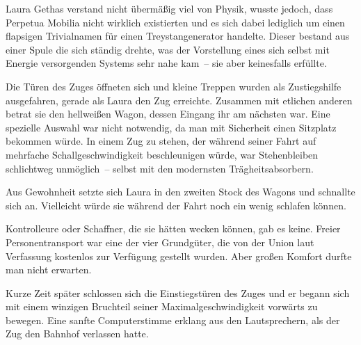 \par

Laura Gethas verstand nicht übermäßig viel von Physik, wusste jedoch, dass Perpetua Mobilia nicht wirklich existierten und es sich dabei lediglich um einen flapsigen Trivialnamen für einen Treystangenerator handelte. Dieser bestand aus einer Spule die sich ständig drehte, was der Vorstellung eines sich selbst mit Energie versorgenden Systems sehr nahe kam~-- sie aber keinesfalls erfüllte.

\par

Die Türen des Zuges öffneten sich und kleine Treppen wurden als Zustiegshilfe ausgefahren, gerade als Laura den Zug erreichte. Zusammen mit etlichen anderen betrat sie den hellweißen Wagon, dessen Eingang ihr am nächsten war. Eine spezielle Auswahl war nicht notwendig, da man mit Sicherheit einen Sitzplatz bekommen würde. In einem Zug zu stehen, der während seiner Fahrt auf mehrfache Schallgeschwindigkeit beschleunigen würde, war Stehenbleiben schlichtweg unmöglich~-- selbst mit den modernsten Trägheitsabsorbern.

\par

Aus Gewohnheit setzte sich Laura in den zweiten Stock des Wagons und schnallte sich an. Vielleicht würde sie während der Fahrt noch ein wenig schlafen können.

\par

Kontrolleure oder Schaffner, die sie hätten wecken können, gab es keine. Freier Personentransport war eine der vier Grundgüter, die von der Union laut Verfassung kostenlos zur Verfügung gestellt wurden. Aber großen Komfort durfte man nicht erwarten.

\par

Kurze Zeit später schlossen sich die Einstiegstüren des Zuges und er begann sich mit einem winzigen Bruchteil seiner Maximalgeschwindigkeit vorwärts zu bewegen. Eine sanfte Computerstimme erklang aus den Lautsprechern, als der Zug den Bahnhof verlassen hatte.

\par


